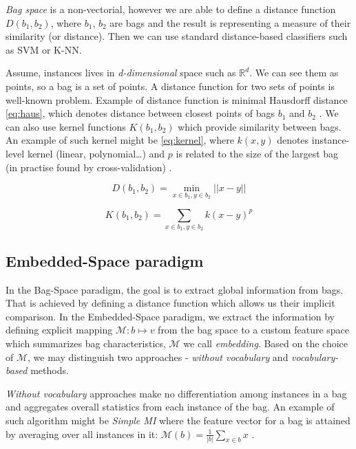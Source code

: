 \emph{Bag space} is a non-vectorial, however we are able to define a distance function $D(b_1,b_2)$, where $b_1$, $b_2$ are bags and the result is representing a measure of their similarity (or distance). Then we can use standard distance-based classifiers such as SVM or K-NN.

Assume, instances lives in \emph{d-dimensional} space such as $\mathbb{R}^{d}$. We can see them as points, so a bag is a set of points. A distance function for two sets of points is well-known problem. Example of distance function is minimal Hausdorff distance \ref{eq:haus}, which denotes distance between closest points of bags $b_1$ and $b_2$ \cite{Wang2000}. We can also use kernel functions $K(b_1,b_2)$ which provide similarity between bags. An example of such kernel might be \ref{eq:kernel}, where $k(x,y)$  denotes instance-level kernel (linear, polynomial\dots) and $p$ is related to the size of the largest bag (in practise found by cross-validation) \cite{Gartner2002}.

\begin{equation} \label{eq:haus}
    D(b_1,b_2)=\min_{x\in b_1, y\in b_2}||x-y||
\end{equation}

\begin{equation} \label{eq:kernel}
    K(b_1,b_2)=\sum_{x\in b_1, y\in b_2}k(x-y)^{p}
\end{equation}

\subsection{Embedded-Space paradigm}
In the Bag-Space paradigm, the goal is to extract global information from bags. That is achieved by defining a distance function which allows us their implicit comparison. In the Embedded-Space paradigm, we extract the information by defining explicit mapping $\mathcal{M}:b\mapsto v$ from the bag space to a custom feature space which summarizes bag characteristics,  $\mathcal{M}$ we call \emph{embedding}. Based on the choice of $\mathcal{M}$, we may distinguish two approaches - \emph{without vocabulary} and \emph{vocabulary-based} methods.

\emph{Without vocabulary} approaches make no differentiation among instances in a bag and aggregates overall statistics from each instance of the bag. An example of such algorithm might be \emph{Simple MI} where the feature vector for a bag is attained by averaging over all instances in it: $\mathcal{M}(b)=\frac{1}{|b|}\sum_{x\in b}x$ \cite{Dong2006}.

